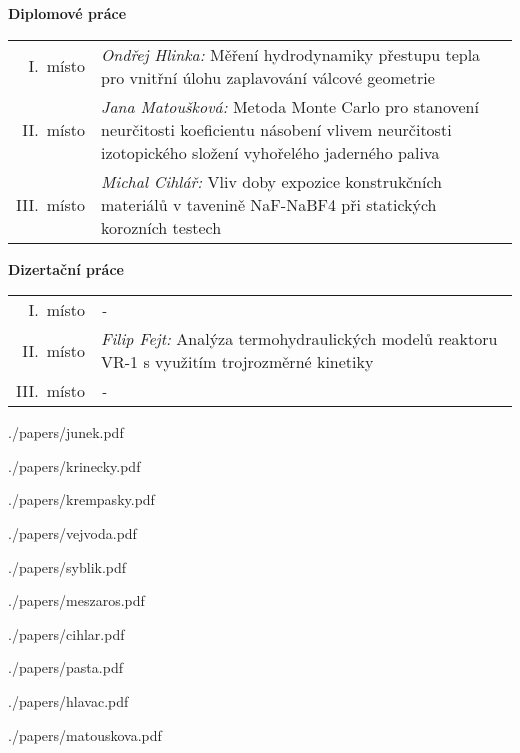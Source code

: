 \documentclass[11pt,oneside]{article}
\newcommand{\clanek}[3]{
    
    {./papers/#1.pdf}
}
\newcommand{\oceneny}[3]{
    #1~místo & \textit{#2} #3 \\
}
\begin{document}
\noindent\textbf{\large{Diplomové práce}}
\begin{table}[h]
    \begin{tabular}{r p{}}
        \oceneny{I.}{Ondřej Hlinka:}{Měření hydrodynamiky přestupu tepla pro vnitřní úlohu zaplavování válcové geometrie}
        \oceneny{II.}{Jana Matoušková:}{Metoda Monte Carlo pro stanovení neurčitosti koeficientu násobení vlivem neurčitosti izotopického složení vyhořelého jaderného paliva}
        \oceneny{III.}{Michal Cihlář:}{Vliv doby expozice konstrukčních materiálů v tavenině NaF-NaBF4 při statických korozních testech}
    \end{tabular}
\end{table}  


\noindent\textbf{\large{Dizertační práce}}
\begin{table}[h]
    \begin{tabular}{r p{}}
        \oceneny{I.}{-}{}
        \oceneny{II.}{Filip Fejt:}{Analýza termohydraulických modelů reaktoru VR-1 s využitím trojrozměrné kinetiky}
        \oceneny{III.}{-}{}
    \end{tabular}
\end{table}  
\vfill

\newpage
\pagestyle{paper}

{}

\clanek{junek}{Matyáš Junek}{Energetické využití jaderné fúze}
\clanek{krinecky}{Tomáš Křinecký}{Prodlužování životnosti JE Dukovany}
\clanek{krempasky}{Robin Krempaský}{Rekonstrukce výkonu AZ metodou RBF pro monitorování reaktorů VVER}
\clanek{vejvoda}{Miroslav Vejvoda}{Modelování vyhořívajících absorbátorů ve výpočtech neutronově-fyzikálních charakteristik aktivních zón}
\clanek{syblik}{Jan Syblík}{Subkanálová analýza VVER-440 pomocí kódu SUBCHANFLOW}
\clanek{meszaros}{Bence Mészáros}{Výzkum materiálových parametrů koria pomocí tavení ve studeném kelímku}
\clanek{cihlar}{Michal Cihlář}{Vliv doby expozice konstrukčních materiálů v tavenině NaF-NaBF4 při statických korozních testech}
\clanek{pasta}{Ondřej Pašta}{Testování debris fretting jevu v CVŘ}
\clanek{hlavac}{Zbyněk Hlaváč}{Ultrazvuková kontrola betonu biologického stínění jaderné elektrárny Greifswald s použitím jádrových vývrtů}
\clanek{matouskova}{Jana Matoušková}{Metoda Monte Carlo pro stanovení neurčitosti koeficientu násobení vlivem neurčitosti izotopického složení vyhořelého jaderného paliva}


\newpage
\pagestyle{patickaSponzoru}
\end{document}
